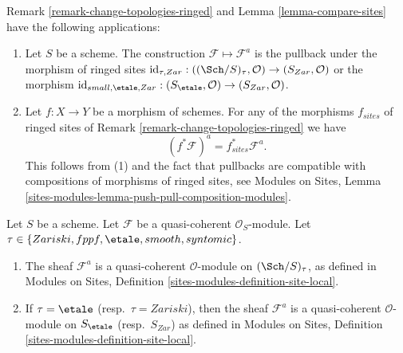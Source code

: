 \begin{remark}
\label{remark-change-topologies-ringed-sites}
Remark \ref{remark-change-topologies-ringed}
and
Lemma \ref{lemma-compare-sites}
have the following applications:
\begin{enumerate}
\item Let $S$ be a scheme.
The construction $\mathcal{F} \mapsto \mathcal{F}^a$ is
the pullback under the morphism of ringed sites
$\text{id}_{\tau, Zar} : ((\Sch/S)_\tau, \mathcal{O})
\to (S_{Zar}, \mathcal{O})$
or the morphism
$\text{id}_{small, \etale, Zar} :
(S_\etale, \mathcal{O}) \to (S_{Zar}, \mathcal{O})$.
\item Let $f : X \to Y$ be a morphism of schemes.
For any of the morphisms $f_{sites}$ of ringed sites of
Remark \ref{remark-change-topologies-ringed}
we have
$$
(f^*\mathcal{F})^a = f_{sites}^*\mathcal{F}^a.
$$
This follows from (1) and the fact that pullbacks are compatible with
compositions of morphisms of ringed sites, see
Modules on Sites,
Lemma \ref{sites-modules-lemma-push-pull-composition-modules}.
\end{enumerate}
\end{remark}

\begin{lemma}
\label{lemma-quasi-coherent-gives-quasi-coherent}
Let $S$ be a scheme.
Let $\mathcal{F}$ be a quasi-coherent $\mathcal{O}_S$-module.
Let $\tau \in \{Zariski, \linebreak[0] fppf, \linebreak[0]
\etale, \linebreak[0] smooth, \linebreak[0] syntomic\}$.
\begin{enumerate}
\item The sheaf $\mathcal{F}^a$ is a quasi-coherent
$\mathcal{O}$-module on $(\Sch/S)_\tau$, as defined in
Modules on Sites, Definition \ref{sites-modules-definition-site-local}.
\item If $\tau = \etale$ (resp.\ $\tau = Zariski$), then the sheaf
$\mathcal{F}^a$ is a quasi-coherent $\mathcal{O}$-module on
$S_\etale$ (resp.\ $S_{Zar}$) as defined in
Modules on Sites, Definition \ref{sites-modules-definition-site-local}.
\end{enumerate}
\end{lemma}

